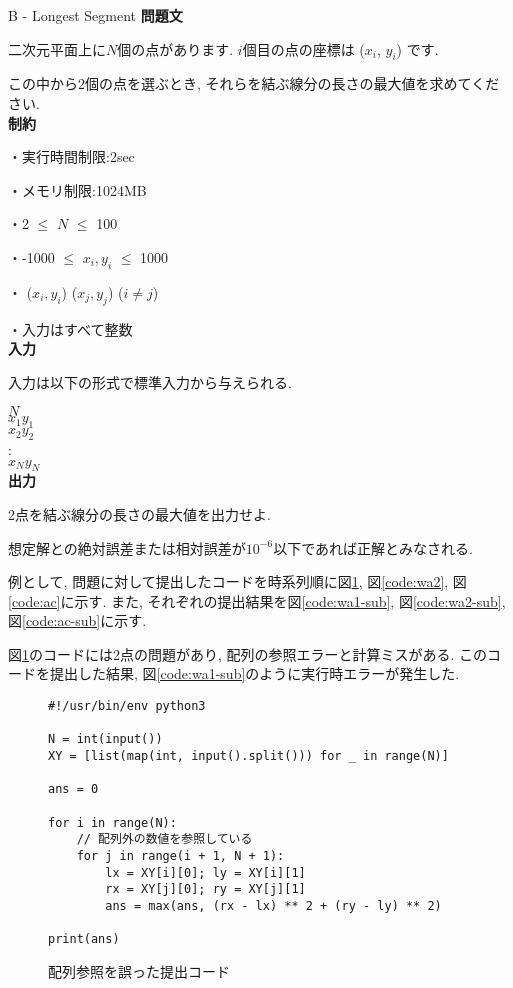 \begin{itembox}[l]{B - Longest Segment}
\textbf{問題文}

二次元平面上に$ N $個の点があります. $i$個目の点の座標は ($x_i$, $y_i$) です. 

この中から2個の点を選ぶとき, それらを結ぶ線分の長さの最大値を求めてください. 
\\

\textbf{制約}

・実行時間制限:2sec

・メモリ制限:1024MB

・2 $\leq$ $N$ $\leq$ 100

・-1000 $\leq$ $x_i, y_i$ $\leq$ 1000

・ ($x_i, y_i$) \neq ($x_j, y_j$) ($i \neq j$)

・入力はすべて整数
\\

\textbf{入力}

入力は以下の形式で標準入力から与えられる. 

$N$ \\ $x_1 y_1$ \\ $x_2 y_2$ \\ : \\ $x_N y_N$
\\

\textbf{出力}

2点を結ぶ線分の長さの最大値を出力せよ. 

想定解との絶対誤差または相対誤差が$10^{-6}$以下であれば正解とみなされる. 


\end{itembox}


\clearpage

例として, 問題に対して提出したコードを時系列順に図\ref{code:wa1}, 図\ref{code:wa2}, 図\ref{code:ac}に示す. 
また, それぞれの提出結果を図\ref{code:wa1-sub}, 図\ref{code:wa2-sub}, 図\ref{code:ac-sub}に示す. 

図\ref{code:wa1}のコードには2点の問題があり, 配列の参照エラーと計算ミスがある. 
このコードを提出した結果, 図\ref{code:wa1-sub}のように実行時エラーが発生した. 


\begin{figure}[H]
    \centering
\begin{lstlisting}[style = customPy]
#!/usr/bin/env python3

N = int(input())
XY = [list(map(int, input().split())) for _ in range(N)]

ans = 0

for i in range(N):
    // 配列外の数値を参照している
    for j in range(i + 1, N + 1):
        lx = XY[i][0]; ly = XY[i][1]
        rx = XY[j][0]; ry = XY[j][1]
        ans = max(ans, (rx - lx) ** 2 + (ry - ly) ** 2)

print(ans)
\end{lstlisting}

\caption{配列参照を誤った提出コード}
    \label{code:wa1}
\end{figure}

